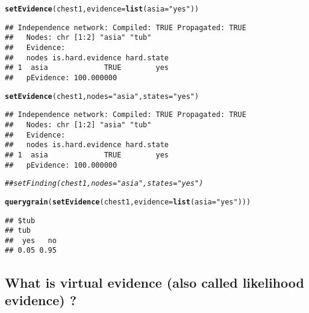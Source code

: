 \documentclass[10pt]{article}\usepackage[]{graphicx}\usepackage[]{color}
\makeatletter
\newcommand{\hlstr}[1]{\textcolor[rgb]{0.192,0.494,0.8}{#1}}%
\newcommand{\hlcom}[1]{\textcolor[rgb]{0.678,0.584,0.686}{\textit{#1}}}%
\newcommand{\hlstd}[1]{\textcolor[rgb]{0.345,0.345,0.345}{#1}}%
\newcommand{\hlkwc}[1]{\textcolor[rgb]{0.333,0.667,0.333}{#1}}%
\newcommand{\hlkwd}[1]{\textcolor[rgb]{0.737,0.353,0.396}{\textbf{#1}}}%
\newenvironment{kframe}{%
 \def\at@end@of@kframe{}%
 \ifinner\ifhmode%
  \def\at@end@of@kframe{\end{minipage}}%
  \begin{minipage}{\columnwidth}%
 \fi\fi%
 \def\FrameCommand##1{\hskip\@totalleftmargin \hskip-\fboxsep
 \colorbox{shadecolor}{##1}\hskip-\fboxsep
     \hskip-\linewidth \hskip-\@totalleftmargin \hskip\columnwidth}%
 \MakeFramed {\advance\hsize-\width
   \@totalleftmargin\z@ \linewidth\hsize
   \@setminipage}}%
 {\par\unskip\endMakeFramed%
 \at@end@of@kframe}
\newenvironment{knitrout}{}{} %
\makeatother
\begin{document}
\begin{knitrout}
\color{fgcolor}\begin{kframe}
\begin{alltt}
\hlkwd{setEvidence}\hlstd{(chest1,} \hlkwc{evidence}\hlstd{=}\hlkwd{list}\hlstd{(}\hlkwc{asia}\hlstd{=}\hlstr{"yes"}\hlstd{))}
\end{alltt}
\begin{verbatim}
## Independence network: Compiled: TRUE Propagated: TRUE 
##   Nodes: chr [1:2] "asia" "tub"
##   Evidence:
##   nodes is.hard.evidence hard.state
## 1  asia             TRUE        yes
##   pEvidence: 100.000000
\end{verbatim}
\begin{alltt}
\hlkwd{setEvidence}\hlstd{(chest1,} \hlkwc{nodes}\hlstd{=}\hlstr{"asia"}\hlstd{,} \hlkwc{states}\hlstd{=}\hlstr{"yes"}\hlstd{)}
\end{alltt}
\begin{verbatim}
## Independence network: Compiled: TRUE Propagated: TRUE 
##   Nodes: chr [1:2] "asia" "tub"
##   Evidence:
##   nodes is.hard.evidence hard.state
## 1  asia             TRUE        yes
##   pEvidence: 100.000000
\end{verbatim}
\begin{alltt}
\hlcom{## setFinding(chest1, nodes="asia", states="yes")}
\end{alltt}
\end{kframe}
\end{knitrout}

\begin{knitrout}
\color{fgcolor}\begin{kframe}
\begin{alltt}
\hlkwd{querygrain}\hlstd{(}\hlkwd{setEvidence}\hlstd{(chest1,} \hlkwc{evidence}\hlstd{=}\hlkwd{list}\hlstd{(}\hlkwc{asia}\hlstd{=}\hlstr{"yes"}\hlstd{)))}
\end{alltt}
\begin{verbatim}
## $tub
## tub
##  yes   no 
## 0.05 0.95
\end{verbatim}
\end{kframe}
\end{knitrout}

\subsection{What is virtual evidence (also called likelihood evidence)
?}
\label{sec:virt-evid-likel}
\end{document}
